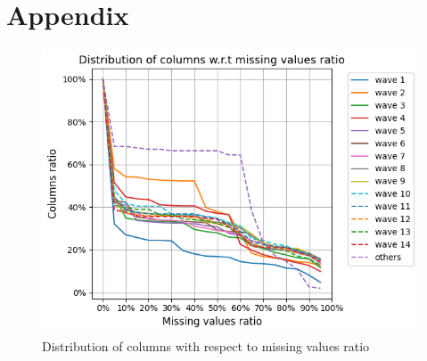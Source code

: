 \documentclass[]{article}
\begin{document}
\section{Appendix}
\begin{figure}[!h]
	\centering
	\includegraphics[scale = 0.75]{distribution_of_columns_wrt_missing_values_ratio.png}
	\caption{Distribution of columns with respect to missing values ratio}
	\label{distribution_of_columns_wrt_missing_values_ratio}
\end{figure}
\end{document}
